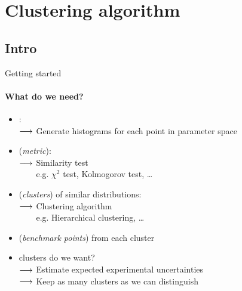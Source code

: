 \section{Clustering algorithm}
\subsection{Intro}
\begin{frame}[t]{Getting started}
    \framesubtitle{What do we need?}
	
    \begin{itemize}
   	\item<+->{
   		:\\
   		$\longrightarrow$ Generate histograms for each point in parameter space
   	}

    \item<+->{
    	\bigskip
         {\color{purple}(\emph{metric})}:\\
    	$\longrightarrow$ Similarity test\\
        $\phantom{\lra}$ {\small e.g. $\chi^2$ test, Kolmogorov test, \dots}
	}
    
    \item<+->{
    	\bigskip
    	 {\color{purple}(\emph{clusters})} of similar distributions:\\
    	$\longrightarrow$ Clustering algorithm\\
        $\phantom{\lra}$ {\small e.g. Hierarchical clustering, \dots}
    }
    
    \item<+->{
        \bigskip
         {\color{purple}(\emph{benchmark points})} from each cluster
    }
    
    \item<+->{
    	\bigskip
    	 clusters do we want?\\
    	$\longrightarrow$ Estimate expected experimental uncertainties\\
    	$\longrightarrow$ Keep as many clusters as we can distinguish
    }
    \end{itemize}
\end{frame}
